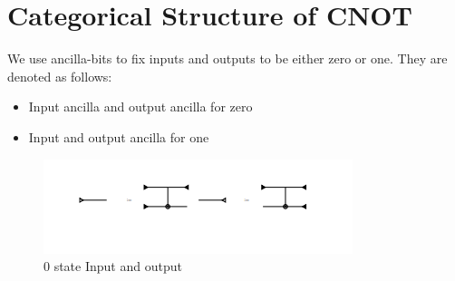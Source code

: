 \documentclass[11pt, oneside]{amsart}
\theoremstyle{definition}
\theoremstyle{definition}
\begin{document}
\section{Categorical Structure of CNOT}
We use ancilla-bits to fix inputs and outputs to be either zero or one. They are
denoted as follows:
\begin{itemize}
    \item Input ancilla and output ancilla for zero
\end{itemize}
\begin{itemize}
    \item Input and output ancilla for one
\end{itemize}
\begin{figure}
    \includegraphics{cnot.PNG}
    \caption{0 state Input and output}
\end{figure}
\end{document}
